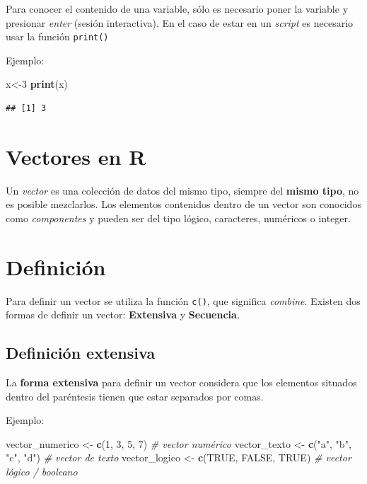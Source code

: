 \documentclass[
]{book}
\newenvironment{Shaded}{\begin{snugshade}}{\end{snugshade}}
\newcommand{\CommentTok}[1]{\textcolor[rgb]{0.56,0.35,0.01}{\textit{#1}}}
\newcommand{\ConstantTok}[1]{\textcolor[rgb]{0.56,0.35,0.01}{#1}}
\newcommand{\DecValTok}[1]{\textcolor[rgb]{0.00,0.00,0.81}{#1}}
\newcommand{\FunctionTok}[1]{\textcolor[rgb]{0.13,0.29,0.53}{\textbf{#1}}}
\newcommand{\NormalTok}[1]{#1}
\newcommand{\OtherTok}[1]{\textcolor[rgb]{0.56,0.35,0.01}{#1}}
\newcommand{\StringTok}[1]{\textcolor[rgb]{0.31,0.60,0.02}{#1}}
\begin{document}
Para conocer el contenido de una variable, sólo es necesario poner la variable y presionar \emph{enter} (sesión interactiva). En el caso de estar en un \emph{script} es necesario usar la función \texttt{print()}

Ejemplo:

\begin{Shaded}
\begin{Highlighting}[]
\NormalTok{x}\OtherTok{\textless{}{-}}\DecValTok{3}
\FunctionTok{print}\NormalTok{(x)}
\end{Highlighting}
\end{Shaded}

\begin{verbatim}
## [1] 3
\end{verbatim}

\hypertarget{vectors}{%
\section{Vectores en R}\label{vectors}}

Un \emph{vector} es una colección de datos del mismo tipo, siempre del \textbf{mismo tipo}, no es posible mezclarlos. Los elementos contenidos dentro de un vector son conocidos como \emph{componentes} y pueden ser del tipo lógico, caracteres, numéricos o integer.

\hypertarget{definiciuxf3n}{%
\section{Definición}\label{definiciuxf3n}}

Para definir un vector se utiliza la función \texttt{c()}, que significa \emph{combine}.
Existen dos formas de definir un vector: \textbf{Extensiva} y \textbf{Secuencia}.

\hypertarget{definiciuxf3n-extensiva}{%
\subsection{Definición extensiva}\label{definiciuxf3n-extensiva}}

La \textbf{forma extensiva} para definir un vector considera que los elementos situados dentro del paréntesis tienen que estar separados por comas.

Ejemplo:

\begin{Shaded}
\begin{Highlighting}[]
\NormalTok{vector\_numerico }\OtherTok{\textless{}{-}} \FunctionTok{c}\NormalTok{(}\DecValTok{1}\NormalTok{, }\DecValTok{3}\NormalTok{, }\DecValTok{5}\NormalTok{, }\DecValTok{7}\NormalTok{)      }\CommentTok{\# vector numérico}
\NormalTok{vector\_texto }\OtherTok{\textless{}{-}} \FunctionTok{c}\NormalTok{(}\StringTok{"a"}\NormalTok{, }\StringTok{"b"}\NormalTok{, }\StringTok{"c"}\NormalTok{, }\StringTok{"d"}\NormalTok{) }\CommentTok{\# vector de texto}
\NormalTok{vector\_logico }\OtherTok{\textless{}{-}} \FunctionTok{c}\NormalTok{(}\ConstantTok{TRUE}\NormalTok{, }\ConstantTok{FALSE}\NormalTok{, }\ConstantTok{TRUE}\NormalTok{) }\CommentTok{\# vector lógico / booleano}
\end{Highlighting}
\end{Shaded}
\end{document}
